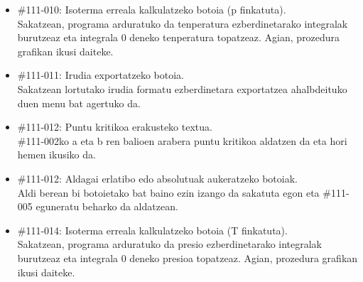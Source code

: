 \documentclass[10pt,a4paper]{article}
\let\nf\normalfont %
\newcommand{\cf}{\normalfont\sffamily}
\begin{document}
\begin{itemize}
\item \cf \#111-010: Isoterma erreala kalkulatzeko botoia (p finkatuta).
\\
\nf Sakatzean, programa arduratuko da tenperatura ezberdinetarako integralak burutzeaz eta integrala 0 deneko tenperatura topatzeaz. Agian, prozedura grafikan ikusi daiteke.

\item \cf \#111-011: Irudia exportatzeko botoia.
\\
\nf Sakatzean lortutako irudia formatu ezberdinetara exportatzea ahalbdeituko duen menu bat agertuko da.

\item \cf \#111-012: Puntu kritikoa erakusteko textua.
\\
\nf \#111-002ko a eta b ren balioen arabera puntu kritikoa aldatzen da eta hori hemen ikusiko da.

\item \cf \#111-012: Aldagai erlatibo edo absolutuak aukeratzeko botoiak.
\\
\nf Aldi berean bi botoietako bat baino ezin izango da sakatuta egon eta \#111-005 eguneratu beharko da aldatzean.

\item \cf \#111-014: Isoterma erreala kalkulatzeko botoia (T finkatuta).
\\
\nf Sakatzean, programa arduratuko da presio ezberdinetarako integralak burutzeaz eta integrala 0 deneko presioa topatzeaz. Agian, prozedura grafikan ikusi daiteke.
\end{itemize}
\end{document}
